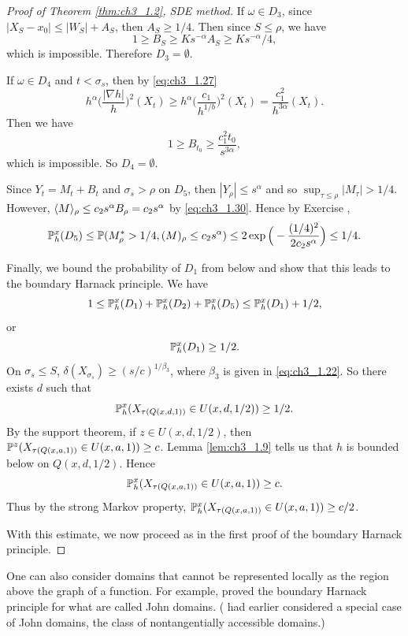 \begin{proof}[Proof of Theorem \ref{thm:ch3_1.2}, SDE method]
If $\omega \in D_3$, since $|X_S - x_0| \leq |W_S| + A_S$, then $A_S \geq 1/4$. Then since $S \leq \rho$, we have
\[
    1 \geq B_S \geq Ks^{-\alpha}A_S \geq Ks^{-\alpha}/4,
\]
which is impossible. Therefore $D_3 = \emptyset$.

If $\omega \in D_4$ and $t < \sigma_s$, then by \eqref{eq:ch3_1.27}
\[
    h^\alpha\Big(\frac{|\nabla h|}{h}\Big)^2(X_t) \geq h^\alpha\Big(\frac{c_1}{h^{1/b}}\Big)^2(X_t) = \frac{c_1^2}{h^{3\alpha}}(X_t).
\]
Then we have
\[
    1 \geq B_{t_0} \geq \frac{c_1^2t_0}{s^{3\alpha}},
\]
which is impossible. So $D_4 = \emptyset$.

Since $Y_t = M_t + B_t$ and $\sigma_s > \rho$ on $D_5$, then $|Y_\rho| \leq s^\alpha$ and so $\sup_{\tau\leq\rho}|M_\tau| > 1/4$. However, $\lrang{M}_\rho \leq c_2s^\alpha B_\rho = c_2s^\alpha$ by \eqref{eq:ch3_1.30}. Hence by Exercise ,
\[
    \P_h^x(D_5) \leq \P(M_\rho^* > 1/4, (M)_\rho \leq c_2s^\alpha) \leq 2\exp\Big(-\frac{(1/4)^2}{2c_2s^\alpha}\Big) \leq 1/4.
\]

Finally, we bound the probability of $D_1$ from below and show that this leads to the boundary Harnack principle. We have
\[
    1 \leq \P_h^x(D_1) + \P_h^x(D_2) + \P_h^x(D_5) \leq \P_h^x(D_1) + 1/2,
\]
or
\mpagebreak
\[
    \P_h^x(D_1) \geq 1/2.
\]
On $\sigma_s \leq S$, $\delta(X_{\sigma_s}) \geq (s/c)^{1/\beta_3}$, where $\beta_3$ is given in \eqref{eq:ch3_1.22}. So there exists $d$ such that
\[
    \P_h^x(X_{\tau(Q(x,d,1))} \in U(x,d,1/2)) \geq 1/2.
\]
By the support theorem, if $z \in U(x,d,1/2)$, then $\P^z(X_{\tau(Q(x,a,1))} \in U(x,a,1)) \geq c$. Lemma \ref{lem:ch3_1.9} tells us that $h$ is bounded below on $Q(x,d,1/2)$. Hence
\[
    \P_h^x(X_{\tau(Q(x,a,1))} \in U(x,a,1)) \geq c.
\]
Thus by the strong Markov property, $\P_h^x(X_{\tau(Q(x,a,1))} \in U(x,a,1)) \geq c/2$.

With this estimate, we now proceed as in the first proof of the boundary Harnack principle.
\end{proof}




One can also consider domains that cannot be represented locally as the region above the graph of a function. For example, \cite{BassBurdzy1991} proved the boundary Harnack principle for what are called John domains. (\cite{JerisonKenig1982b} had earlier considered a special case of John domains, the class of nontangentially accessible domains.)

